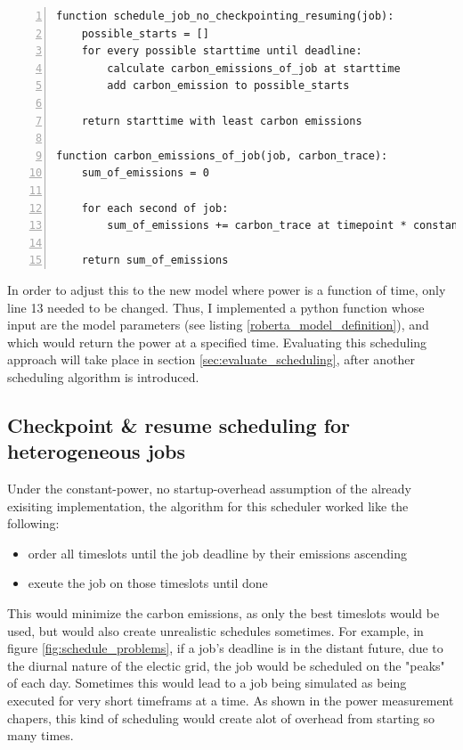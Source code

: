 \begin{lstlisting}[frame=single, numbers=left, caption={Pseudocode for non-interrupt oracle scheduling}, label={list:pseudocode_oracle}, basicstyle=\ttfamily]
function schedule_job_no_checkpointing_resuming(job):
    possible_starts = []
    for every possible starttime until deadline:
        calculate carbon_emissions_of_job at starttime
        add carbon_emission to possible_starts
    
    return starttime with least carbon emissions

function carbon_emissions_of_job(job, carbon_trace):
    sum_of_emissions = 0

    for each second of job:
        sum_of_emissions += carbon_trace at timepoint * constant_watt
    
    return sum_of_emissions
\end{lstlisting}

In order to adjust this to the new model where power is a function of time, only line 13 needed to be changed. 
Thus, I implemented a python function whose input are the model parameters (see listing \ref{roberta_model_definition}), and which would return the power at a specified time. 
Evaluating this scheduling approach will take place in section \ref{sec:evaluate_scheduling}, after another scheduling algorithm is introduced.


\subsection{{Checkpoint \& resume scheduling for heterogeneous jobs}}

Under the constant-power, no startup-overhead assumption of the already exisiting implementation, the algorithm for this scheduler worked like the following:

\begin{itemize}
    \item order all timeslots until the job deadline by their emissions ascending
    \item exeute the job on those timeslots until done
\end{itemize}

This would minimize the carbon emissions, as only the best timeslots would be used, but would also create unrealistic schedules sometimes. 
For example, in figure \ref{fig:schedule_problems}, if a job's deadline is in the distant future, due to the diurnal nature of the electic grid, the job would be scheduled on the "peaks" of each day. Sometimes this would lead to a job being simulated as being executed for very short timeframs at a time. As shown in the power measurement chapers, this kind of scheduling would create alot of overhead from starting so many times.

